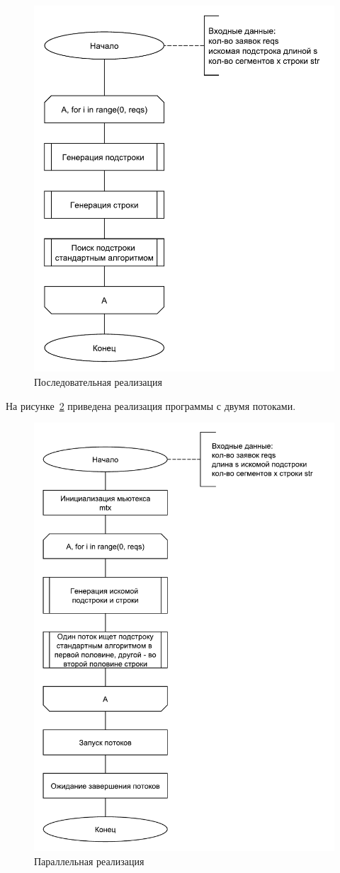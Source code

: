 \begin{figure}
	\centering
	\includegraphics[width=0.7\linewidth]{images/linear}
	\caption[]{Последовательная реализация}
	\label{fig:linear}
\end{figure}

\newpage
На рисунке~\ref{fig:parallel} приведена реализация программы с двумя потоками.

\begin{figure}
	\centering
	\includegraphics[width=0.7\linewidth]{images/parallel}
	\caption[]{Параллельная реализация}
	\label{fig:parallel}
\end{figure}

